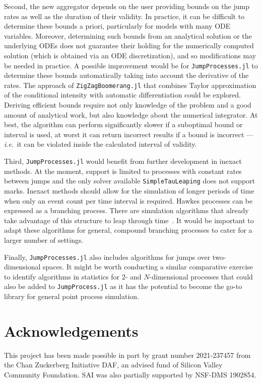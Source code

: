 \documentclass{juliacon}
\numberwithin{equation}{section}
\newcommand{\ie}{\textit{i}.\textit{e}.}
\begin{document}
Second, the new aggregator depends on the user providing bounds on the jump rates as well as the duration of their validity. In practice, it can be difficult to determine these bounds a priori, particularly for models with many ODE variables. Moreover, determining such bounds from an analytical solution or the underlying ODEs does not guarantee their holding for the numerically computed solution (which is obtained via an ODE discretization), and so modifications may be needed in practice. A possible improvement would be for \texttt{JumpProcesses.jl} to determine these bounds automatically taking into account the derivative of the rates. The approach of \texttt{ZigZagBoomerang.jl} that combines Taylor approximation of the conditional intensity with automatic differentiation could be explored. Deriving efficient bounds require not only knowledge of the problem and a good amount of analytical work, but also knowledge about the numerical integrator. At best, the algorithm can perform significantly slower if a suboptimal bound or interval is used, at worst it can return incorrect results if a bound is incorrect --- \ie~it can be violated inside the calculated interval of validity. 

Third, \texttt{JumpProcesses.jl} would benefit from further development in inexact methods. At the moment, support is limited to processes with constant rates between jumps and the only solver available \texttt{SimpleTauLeaping} does not support marks. Inexact methods should allow for the simulation of longer periods of time when only an event count per time interval is required. Hawkes processes can be expressed as a branching process. There are simulation algorithms that already take advantage of this structure to leap through time~\cite{laub2021}. It would be important to adapt these algorithms for general, compound branching processes to cater for a larger number of settings. 

Finally, \texttt{JumpProcesses.jl} also includes algorithms for jumps over two-dimensional spaces. It might be worth conducting a similar comparative exercise to identify algorithms in statistics for \(2 \)- and \( N \)-dimensional processes that could also be added to \texttt{JumpProcess.jl} as it has the potential to become the go-to library for general point process simulation.

\section{Acknowledgements}
This project has been made possible in part by grant number 2021-237457 from the Chan Zuckerberg Initiative DAF, an advised fund of Silicon Valley Community Foundation. SAI was also partially supported by NSF-DMS 1902854.
\end{document}
